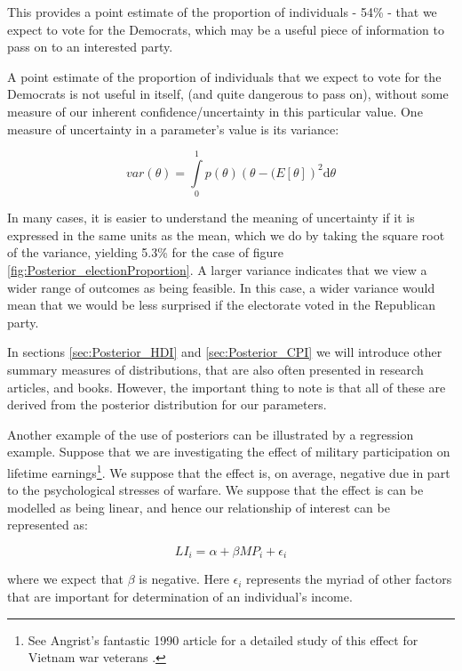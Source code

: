 \documentclass[11pt,fullpage]{book}
\begin{document}
This provides a point estimate of the proportion of individuals - 54\% - that we expect to vote for the Democrats, which may be a useful piece of information to pass on to an interested party. 

A point estimate of the proportion of individuals that we expect to vote for the Democrats is not useful in itself, (and quite dangerous to pass on), without some measure of our inherent confidence/uncertainty in this particular value. One measure of uncertainty in a parameter's value is its variance:

\begin{equation}
var(\theta)=  \int\limits_{0}^{1} p(\theta)(\theta-\mathbb(E[\theta])^2 \mathrm{d}\theta
\end{equation}

In many cases, it is easier to understand the meaning of uncertainty if it is expressed in the same units as the mean, which we do by taking the square root of the variance, yielding 5.3\% for the case of figure \ref{fig:Posterior_electionProportion}. A larger variance indicates that we view a wider range of outcomes as being feasible. In this case, a wider variance would mean that we would be less surprised if the electorate voted in the Republican party. 

In sections \ref{sec:Posterior_HDI} and \ref{sec:Posterior_CPI} we will introduce other summary measures of distributions, that are also often presented in research articles, and books. However, the important thing to note is that all of these are derived from the posterior distribution for our parameters. 

Another example of the use of posteriors can be illustrated by a regression example. Suppose that we are investigating the effect of military participation on lifetime earnings\footnote{See Angrist's fantastic 1990 article for a detailed study of this effect for Vietnam war veterans \cite{angrist1990lifetime}.}. We suppose that the effect is, on average, negative due in part to the psychological stresses of warfare. We suppose that the effect is can be modelled as being linear, and hence our relationship of interest can be represented as:

\begin{equation}\label{eq:Posterior_militaryParticipation}
LI_i = \alpha + \beta MP_i + \epsilon_i
\end{equation}

where we expect that $\beta$ is negative. Here $\epsilon_i$ represents the myriad of other factors that are important for determination of an individual's income.
\end{document}

